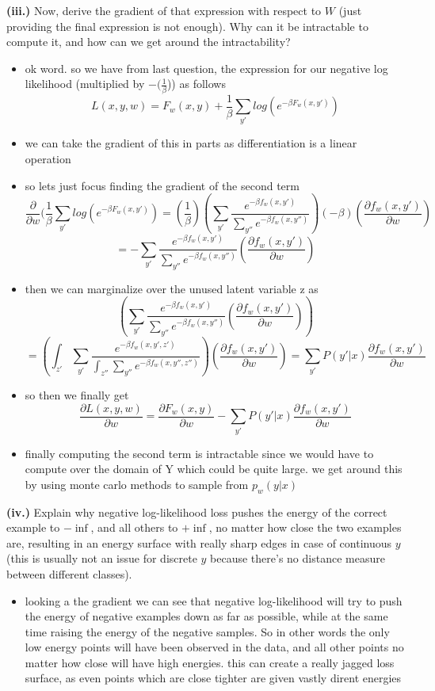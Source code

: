 \documentclass{article}
\begin{document}
\textbf{(iii.)} Now, derive the gradient of that expression with respect to $W$ (just providing the final expression is not enough). Why can it be intractable to compute it, and how can we get around the intractability? \\
\begin{itemize}
    \color{red}
    \item ok word. so we have from last question, the expression for our negative log likelihood (multiplied by $-(\frac{1}{\beta}$)) as follows $$L(x,y,w)=F_{w}(x,y)+\frac{1}{\beta}\sum_{y'}log(e^{- \beta F_{w}(x,y')})$$
    \item we can take the gradient of this in parts as differentiation is a linear operation
    \item so lets just focus finding the gradient of the second term  $$\frac{\partial}{\partial w}(\frac{1}{\beta}\sum_{y'}log(e^{-\beta F_{w}(x,y')})=(\frac{1}{\beta})(\sum_{y'}\frac{e^{-\beta f_{w}(x,y')}}{\sum_{y''} e^{-\beta f_{w}(x,y'')}})(-\beta)(\frac{\partial f_{w}(x,y')}{\partial w})$$ $$=-\sum_{y'}\frac{e^{-\beta f_{w}(x,y')}}{\sum_{y''} e^{-\beta f_{w}(x,y'')}}(\frac{\partial f_{w}(x,y')}{\partial w})$$ 
    \item then we can marginalize over the unused latent variable z as $$(\sum_{y'}\frac{e^{-\beta f_{w}(x,y')}}{\sum_{y''} e^{-\beta f_{w}(x,y'')}}(\frac{\partial f_{w}(x,y')}{\partial w}))$$ $$ =(\int_{z'}\sum_{y'}\frac{e^{-\beta f_{w}(x,y', z')}}{\int_{z''}\sum_{y''} e^{-\beta f_{w}(x,y'',z'')}})(\frac{\partial f_{w}(x,y')}{\partial w})=\sum_{y'}P(y'|x)\frac{\partial f_{w}(x,y')}{\partial w}$$
    \item so then we finally get $$\frac{\partial L(x,y,w)}{\partial w}=\frac{\partial F_{w}(x,y)}{\partial w}-\sum_{y'}P(y'|x)\frac{\partial f_{w}(x,y')}{\partial w}$$
    \item finally computing the second term is intractable since we would have to compute over the domain of Y which could be quite large. we get around this by using monte carlo methods to sample from $p_w(y|x)$
\end{itemize}


\textbf{(iv.)} Explain why negative log-likelihood loss pushes the energy of the correct example to $-\inf$, and all others to $+\inf$, no matter how close the two examples are, resulting in an energy surface with really sharp edges in case of continuous $y$ (this is usually not an issue for discrete $y$ because there’s no distance measure between different classes). \\
\begin{itemize}
    \color{red}
    \item looking a the gradient we can see that negative log-likelihood will try to push the energy of negative examples down as far as possible, while at the same time raising the energy of the negative samples. So in other words the only low energy points will have been observed in the data, and all other points no matter how close will have high energies. this can create a really jagged loss surface, as even points which are close tighter are given vastly dirent energies  
\end{itemize}
\end{document}
